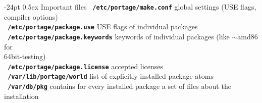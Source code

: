 \documentclass[landscape]{article}
\makeatletter
\renewcommand\section{\@startsection{section}{1}{0mm}%
                                     {-24pt}%
                                     {0.5ex}%
                                {\color{black}\normalfont\large\bfseries}}
\newcommand{\code}{\texttt}
\newcommand{\bcode}[1]{\texttt{\textbf{\color{blue} #1}}}
\makeatother
\begin{document}
\begin{multicols*}{2}
\section{Important files}
\bcode{/etc/portage/make.conf} global settings (USE flags, compiler options)\\
\bcode{/etc/portage/package.use} USE flags of individual packages\\
\bcode{/etc/portage/package.keywords} keywords of individual packages (like $\sim{}$amd86 for\\ 64bit-testing)\\
\bcode{/etc/portage/package.license} accepted licenses\\
\bcode{/var/lib/portage/world} list of explicitly installed package atoms\\
\bcode{/var/db/pkg} contains for every installed package a set of files about the installation

\end{multicols*}
\end{document}
